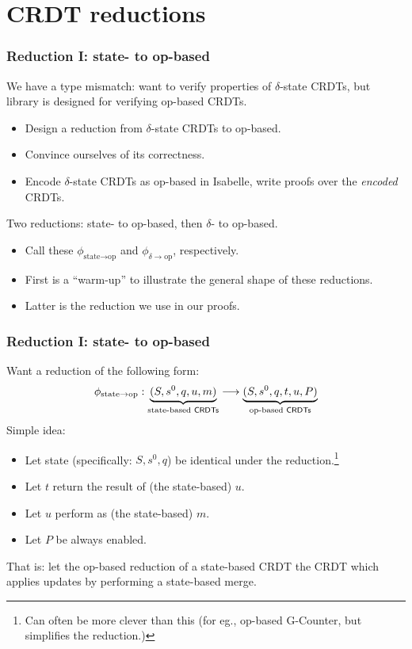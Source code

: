 \documentclass[aspectratio=169,compress,handout]{beamer}
\newcommand*{\CRDT}{\textsf{CRDT}\xspace}
\newcommand*{\CRDTs}{\textsf{CRDTs}\xspace}
\begin{document}
  \section{\CRDT reductions}
  \begin{frame}
    \frametitle{Reduction I: state- to op-based}

    We have a type mismatch: want to verify properties of $\delta$-state \CRDTs,
    but library is designed for verifying op-based \CRDTs.
    \begin{itemize}[<+(1)->]
      \item Design a reduction from $\delta$-state \CRDTs to op-based.
      \item Convince ourselves of its correctness.
      \item Encode $\delta$-state \CRDTs as op-based in Isabelle, write proofs
        over the \emph{encoded} \CRDTs.
    \end{itemize}
    \pause
    Two reductions: state- to op-based, then $\delta$- to op-based.
    \begin{itemize}[<+(1)->]
      \item Call these $\phi_{\text{state} \to \text{op}}$ and $\phi_{\delta
        \to \text{op}}$, respectively.
      \item First is a ``warm-up'' to illustrate the general shape of these
        reductions.
      \item Latter is the reduction we use in our proofs.
    \end{itemize}
  \end{frame}

  \begin{frame}
    \frametitle{Reduction I: state- to op-based}
    Want a reduction of the following form:
    \[
      \phi_{\text{state} \to \text{op}} :
        \underbrace{(S, s^0, q, u, m)}_{\text{state-based \CRDTs}} \longrightarrow
        \underbrace{(S, s^0, q, t, u, P)}_{\text{op-based \CRDTs}}
    \]
    \pause
    Simple idea:
    \begin{itemize}[<+->]
      \item Let state (specifically: $S, s^0, q$) be identical under the
        reduction.\footnote{Can often be more clever than this (for eg.,
        op-based G-Counter, but simplifies the reduction.)}
      \item Let $t$ return the result of (the state-based) $u$.
      \item Let $u$ perform as (the state-based) $m$.
      \item Let $P$ be always enabled.
    \end{itemize}
    \pause
    That is: let the op-based reduction of a state-based \CRDT the \CRDT which
    applies updates by performing a state-based merge.
  \end{frame}
\end{document}
